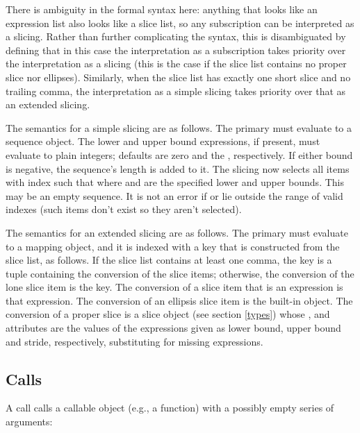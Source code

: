 There is ambiguity in the formal syntax here: anything that looks like
an expression list also looks like a slice list, so any subscription
can be interpreted as a slicing.  Rather than further complicating the
syntax, this is disambiguated by defining that in this case the
interpretation as a subscription takes priority over the
interpretation as a slicing (this is the case if the slice list
contains no proper slice nor ellipses).  Similarly, when the slice
list has exactly one short slice and no trailing comma, the
interpretation as a simple slicing takes priority over that as an
extended slicing.

The semantics for a simple slicing are as follows.  The primary must
evaluate to a sequence object.  The lower and upper bound expressions,
if present, must evaluate to plain integers; defaults are zero and the
, respectively.  If either bound is negative, the
sequence's length is added to it.  The slicing now selects all items
with index  such that
 where 
and  are the specified lower and upper bounds.  This may be an
empty sequence.  It is not an error if  or  lie outside the
range of valid indexes (such items don't exist so they aren't
selected).

The semantics for an extended slicing are as follows.  The primary
must evaluate to a mapping object, and it is indexed with a key that
is constructed from the slice list, as follows.  If the slice list
contains at least one comma, the key is a tuple containing the
conversion of the slice items; otherwise, the conversion of the lone
slice item is the key.  The conversion of a slice item that is an
expression is that expression.  The conversion of an ellipsis slice
item is the built-in  object.  The conversion of a
proper slice is a slice object (see section \ref{types}) whose
,  and  attributes are the
values of the expressions given as lower bound, upper bound and
stride, respectively, substituting  for missing
expressions.


\subsection{Calls\label{calls}}

A call calls a callable object (e.g., a function) with a possibly empty
series of arguments:

